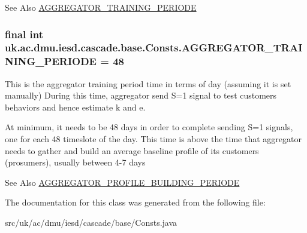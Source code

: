\begin{DoxySeeAlso}{See Also}
\hyperlink{classuk_1_1ac_1_1dmu_1_1iesd_1_1cascade_1_1base_1_1_consts_ae6ae5502793dd1cdc06cdfedfa66b8f8}{A\-G\-G\-R\-E\-G\-A\-T\-O\-R\-\_\-\-T\-R\-A\-I\-N\-I\-N\-G\-\_\-\-P\-E\-R\-I\-O\-D\-E} 
\end{DoxySeeAlso}
\hypertarget{classuk_1_1ac_1_1dmu_1_1iesd_1_1cascade_1_1base_1_1_consts_ae6ae5502793dd1cdc06cdfedfa66b8f8}{
\subsubsection[{A\-G\-G\-R\-E\-G\-A\-T\-O\-R\-\_\-\-T\-R\-A\-I\-N\-I\-N\-G\-\_\-\-P\-E\-R\-I\-O\-D\-E}]{\setlength{\rightskip}{0pt plus 5cm}final int uk.\-ac.\-dmu.\-iesd.\-cascade.\-base.\-Consts.\-A\-G\-G\-R\-E\-G\-A\-T\-O\-R\-\_\-\-T\-R\-A\-I\-N\-I\-N\-G\-\_\-\-P\-E\-R\-I\-O\-D\-E = 48\hspace{0.3cm}{\ttfamily [static]}}}\label{classuk_1_1ac_1_1dmu_1_1iesd_1_1cascade_1_1base_1_1_consts_ae6ae5502793dd1cdc06cdfedfa66b8f8}


This is the aggregator training period time in terms of day (assuming it is set manually) During this time, aggregator send S=1 signal to test customers behaviors and hence estimate k and e. 

At minimum, it needs to be 48 days in order to complete sending S=1 signals, one for each 48 timeslote of the day. This time is above the time that aggregator needs to gather and build an average baseline profile of its customers (prosumers), usually between 4-\/7 days \begin{DoxySeeAlso}{See Also}
\hyperlink{classuk_1_1ac_1_1dmu_1_1iesd_1_1cascade_1_1base_1_1_consts_a3d47484df22ee731ef9618cfb2242ea6}{A\-G\-G\-R\-E\-G\-A\-T\-O\-R\-\_\-\-P\-R\-O\-F\-I\-L\-E\-\_\-\-B\-U\-I\-L\-D\-I\-N\-G\-\_\-\-P\-E\-R\-I\-O\-D\-E} 
\end{DoxySeeAlso}


The documentation for this class was generated from the following file\-:\begin{DoxyCompactItemize}
\item 
src/uk/ac/dmu/iesd/cascade/base/Consts.\-java\end{DoxyCompactItemize}
